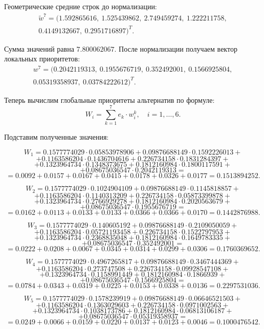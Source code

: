 Геометрические средние строк до нормализации:
\begin{gather*}
\tilde{w}^7 = (1.592865616,\ 1.525439862,\ 2.749459274,\ 1.222211758,\\ 0.4149132667,\ 0.2951716897)^T.
\end{gather*}

Сумма значений равна $7.800062067$. После нормализации получаем вектор локальных приоритетов:
\begin{gather*}
w^7 = (0.2042119313,\ 0.1955676719,\ 0.352492001,\ 0.1566925804,\\ 0.05319358937,\ 0.03784222612)^T.
\end{gather*}


Теперь вычислим глобальные приоритеты альтернатив по формуле:
\[
W_i = \sum_{k=1}^{7} e_k \cdot w_i^k, \quad i = 1, \ldots, 6.
\]

Подставим полученные значения:

\[
W_1 = 0.1577774029 \cdot 0.05853978906 + 0.09876688149 \cdot 0.1592226013 +
\]
\[
+ 0.1163586204 \cdot 0.1436704616 + 0.226734158 \cdot 0.1831284397 +
\]
\[
+ 0.1323964734 \cdot 0.1348373675 + 0.1812160984 \cdot 0.1800117591 +
\]
\[
+ 0.08675036547 \cdot 0.2042119313 =
\]
\[
= 0.0092 + 0.0157 + 0.0167 + 0.0415 + 0.0178 + 0.0326 + 0.0177 = 0.1513894252.
\]

\[
W_2 = 0.1577774029 \cdot 0.1024904109 + 0.09876688149 \cdot 0.1145818857 +
\]
\[
+ 0.1163586204 \cdot 0.1140313209 + 0.226734158 \cdot 0.05873399878 +
\]
\[
+ 0.1323964734 \cdot 0.2766929278 + 0.1812160984 \cdot 0.2020563679 +
\]
\[
+ 0.08675036547 \cdot 0.1955676719 =
\]
\[
= 0.0162 + 0.0113 + 0.0133 + 0.0133 + 0.0366 + 0.0366 + 0.0170 = 0.1442876988.
\]

\[
W_3 = 0.1577774029 \cdot 0.140605192 + 0.09876688149 \cdot 0.2109050059 +
\]
\[
+ 0.1163586204 \cdot 0.05721193458 + 0.226734158 \cdot 0.1522797953 +
\]
\[
+ 0.1323964734 \cdot 0.2368835048 + 0.1812160984 \cdot 0.1649783335 +
\]
\[
+ 0.08675036547 \cdot 0.352492001 =
\]
\[
= 0.0222 + 0.0208 + 0.0067 + 0.0345 + 0.0314 + 0.0299 + 0.0306 = 0.1760369652.
\]

\[
W_4 = 0.1577774029 \cdot 0.4967265817 + 0.09876688149 \cdot 0.3467444369 +
\]
\[
+ 0.1163586204 \cdot 0.273747508 + 0.226734158 \cdot 0.09928547108 +
\]
\[
+ 0.1323964734 \cdot 0.1158991449 + 0.1812160984 \cdot 0.1866939 +
\]
\[
+ 0.08675036547 \cdot 0.1566925804 =
\]
\[
= 0.0784 + 0.0343 + 0.0319 + 0.0225 + 0.0153 + 0.0338 + 0.0136 = 0.2297531036.
\]

\[
W_5 = 0.1577774029 \cdot 0.1578239919 + 0.09876688149 \cdot 0.06646521503 +
\]
\[
+ 0.1163586204 \cdot 0.1363029603 + 0.226734158 \cdot 0.0971002563 +
\]
\[
+ 0.1323964734 \cdot 0.1038173786 + 0.1812160984 \cdot 0.06813106187 +
\]
\[
+ 0.08675036547 \cdot 0.05319358937 =
\]
\[
= 0.0249 + 0.0066 + 0.0159 + 0.0220 + 0.0137 + 0.0123 + 0.0046 = 0.1000476542.
\]

